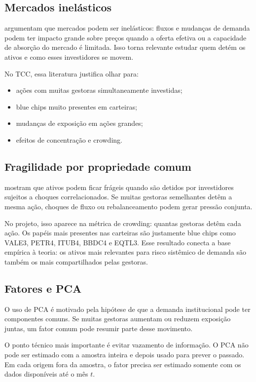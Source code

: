 \documentclass[11pt,a4paper]{article}
\begin{document}
\subsection{Mercados inelásticos}

\citet{gabaixkoijen2021} argumentam que mercados podem ser inelásticos: fluxos e mudanças de demanda podem
ter impacto grande sobre preços quando a oferta efetiva ou a capacidade de absorção do mercado é limitada.
Isso torna relevante estudar quem detém os ativos e como esses investidores se movem.

No TCC, essa literatura justifica olhar para:
\begin{itemize}
\item ações com muitas gestoras simultaneamente investidas;
\item blue chips muito presentes em carteiras;
\item mudanças de exposição em ações grandes;
\item efeitos de concentração e crowding.
\end{itemize}

\subsection{Fragilidade por propriedade comum}

\citet{greenwoodthesmar2011} mostram que ativos podem ficar frágeis quando são detidos por investidores
sujeitos a choques correlacionados. Se muitas gestoras semelhantes detêm a mesma ação, choques de fluxo ou
rebalanceamento podem gerar pressão conjunta.

No projeto, isso aparece na métrica de crowding: quantas gestoras detêm cada ação. Os papéis mais presentes
nas carteiras são justamente blue chips como VALE3, PETR4, ITUB4, BBDC4 e EQTL3. Esse resultado conecta a
base empírica à teoria: os ativos mais relevantes para risco sistêmico de demanda são também os mais
compartilhados pelas gestoras.

\subsection{Fatores e PCA}

O uso de PCA é motivado pela hipótese de que a demanda institucional pode ter componentes comuns. Se muitas
gestoras aumentam ou reduzem exposição juntas, um fator comum pode resumir parte desse movimento.

O ponto técnico mais importante é evitar vazamento de informação. O PCA não pode ser estimado com a amostra
inteira e depois usado para prever o passado. Em cada origem fora da amostra, o fator precisa ser estimado
somente com os dados disponíveis até o mês $t$.
\end{document}
